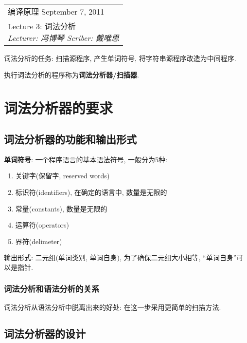 \def\lecture{3}
\clearpage \noindent\begin{tabularx}{\linewidth}{|X|}
\hline \vskip -2mm
{\sf 编译原理} \hfill September 7, 2011 \\
{\centering \sf \large Lecture \lecture:
词法分析 \\ }
\textsl{Lecturer: 冯博琴 \hfill Scriber: 戴唯思}\\ \hline
\end{tabularx}
\setcounter{section}{0}
\renewcommand{\thepage}{\lecture -\arabic{page}}

词法分析的任务: 扫描源程序, 产生单词符号, 将字符串源程序改造为中间程序.

执行词法分析的程序称为\textbf{词法分析器/扫描器}.

\section{词法分析器的要求}

    \subsection{词法分析器的功能和输出形式}

        \textbf{单词符号}: 一个程序语言的基本语法符号, 一般分为5种:

        \begin{enumerate}
            \item 关键字(保留字, reserved words)
            \item 标识符(identifiers), 在确定的语言中, 数量是无限的
            \item 常量(constants), 数量是无限的
            \item 运算符(operators)
            \item 界符(delimeter)
        \end{enumerate}

        输出形式: 二元组(单词类别, 单词自身), 为了确保二元组大小相等, ``单词自身''可以是指针.

        \subsubsection{词法分析和语法分析的关系}

            词法分析从语法分析中脱离出来的好处: 在这一步采用更简单的扫描方法.
    
    \subsection{词法分析器的设计}

